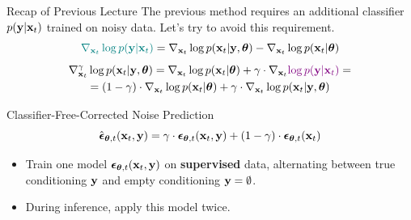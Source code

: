 \documentclass{beamer}
\begin{document}
\begin{frame}{Recap of Previous Lecture}
	The previous method requires an additional classifier $p(\mathbf{y} | \mathbf{x}_t)$ trained on noisy data. Let's try to avoid this requirement.
	\[
		{\color{teal}\nabla_{\mathbf{x}_t} \log p(\mathbf{y} | \mathbf{x}_t)} =  \nabla_{\mathbf{x}_t} \log p(\mathbf{x}_t| \mathbf{y}, \boldsymbol{\theta}) -\nabla_{\mathbf{x}_t} \log  p(\mathbf{x}_t | \boldsymbol{\theta})
	\]
	\vspace{-0.4cm}
	\begin{multline*}
		\nabla_{\mathbf{x}_t}^{\gamma} \log p(\mathbf{x}_t | \mathbf{y}, \boldsymbol{\theta}) = \nabla_{\mathbf{x}_t} \log p(\mathbf{x}_t | \boldsymbol{\theta}) + \gamma \cdot \nabla_{\mathbf{x}_t} {\color{violet}\log p(\mathbf{y} | \mathbf{x}_t)} = \\
		=  (1 - \gamma) \cdot  \nabla_{\mathbf{x}_t} \log p(\mathbf{x}_t | \boldsymbol{\theta}) + \gamma \cdot  \nabla_{\mathbf{x}_t} \log p(\mathbf{x}_t| \mathbf{y}, \boldsymbol{\theta})
	\end{multline*}
	\vspace{-0.4cm}
	\begin{block}{Classifier-Free-Corrected Noise Prediction}
		\vspace{-0.3cm}
		\[
			\hat{\boldsymbol{\epsilon}}_{\boldsymbol{\theta}, t}(\mathbf{x}_t, \mathbf{y}) = \gamma \cdot \boldsymbol{\epsilon}_{\boldsymbol{\theta}, t}(\mathbf{x}_t, \mathbf{y}) + (1 - \gamma) \cdot \boldsymbol{\epsilon}_{\boldsymbol{\theta}, t}(\mathbf{x}_t)
		\]
		\vspace{-0.5cm}
	\end{block}
	\begin{itemize}
		\item Train one model $\boldsymbol{\epsilon}_{\boldsymbol{\theta}, t}(\mathbf{x}_t, \mathbf{y})$ on \textbf{supervised} data, alternating between true conditioning $\mathbf{y}$ and empty conditioning $\mathbf{y} = \emptyset$.
		\item During inference, apply this model twice.
	\end{itemize}
	
\end{frame}
\end{document}
